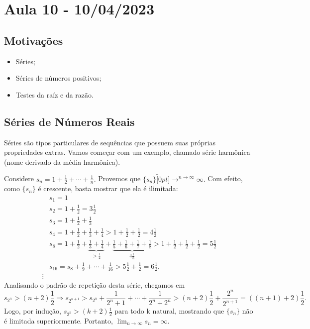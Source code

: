 \documentclass[Analysis/analysis_notes.tex]{subfiles}
\begin{document}
\section{Aula 10 - 10/04/2023}
\subsection{Motiva\c c\~oes}
 \begin{itemize}
 \item S\'eries;
 \item S\'eries de n\'umeros positivos;
 \item Testes da ra\'iz e da raz\~ao.
 \end{itemize}

\subsection{S\'eries de N\'umeros Reais}
  S\'eries s\~ao tipos particulares de sequ\^encias que possuem suas pr\'oprias propriedades extras. Vamos come\c car com um exemplo, chamado s\'erie harm\^onica (nome derivado da m\'edia harm\^onica).
 \begin{example}
   Considere $s_{n} = 1 + \frac{1}{2} + \cdots + \frac{1}{n}.$ Provemos que $\{s_{n}\}\overbracket[0pt]{\longrightarrow}^{n\to \infty}\infty.$
   Com efeito, como $\{s_{n}\} $ \'e crescente, basta mostrar que ela \'e ilimitada: 
  \begin{align*}
    &s_{1} = 1\\
    &s_{2} = 1 + \frac{1}{2} = 3\frac{1}{2}\\
    &s_{3} = 1 + \frac{1}{2} + \frac{1}{3}\\
    &s_{4} = 1 + \frac{1}{2} + \frac{1}{3} + \frac{1}{4} > 1 + \frac{1}{2} + \frac{1}{2} = 4\frac{1}{2}\\
    &s_{8} = 1 + \frac{1}{2} + \underbrace{\frac{1}{3} + \frac{1}{4}}_{> \frac{1}{2}} + \underbrace{\frac{1}{5} + \frac{1}{6} + \frac{1}{7} + \frac{1}{8}}_{4\frac{1}{8}} > 1 + \frac{1}{2} + \frac{1}{2} + \frac{1}{2} = 5\frac{1}{2}\\
    &s_{16} = s_{8} + \frac{1}{9} +\cdots + \frac{1}{16} > 5\frac{1}{2} + \frac{1}{2} = 6\frac{1}{2}.\\
    \vdots
  \end{align*}
  Analisando o padr\~ao de repeti\c c\~ao desta s\'erie, chegamos em 
    $$
      s_{2^{n}} > (n+2)\frac{1}{2} \Rightarrow s_{2^{n+1}} > s_{2^n} + \frac{1}{2^{n}+1} + \cdots + \frac{1}{2^{n}+ 2^{n}} > (n+2)\frac{1}{2} + \frac{2^{n}}{2^{n+1}} = ((n+1)+2)\frac{1}{2}.
    $$
    Logo, por indu\c c\~ao, $s_{2^{k}} > (k+2)\frac{1}{2}$ para todo k natural, mostrando que $\{s_{n}\} $ n\~ao \'e limitada superiormente.
  Portanto, $\lim_{n\to\infty}s_{n} = \infty.$ \qedsymbol
 \end{example}
\end{document}
